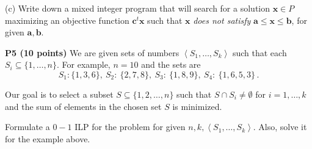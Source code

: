\documentclass[11pt]{article}
\begin{document}
\noindent (c) Write down a mixed integer program that will search for a solution
$\mathbf{x} \in P$ maximizing an objective function $\mathbf{c}^t \mathbf{x}$ 
such that $\mathbf{x}$ \emph{does not satisfy}
$\mathbf{a} \leq \mathbf{x} \leq \mathbf{b}$, for given $\mathbf{a}, \mathbf{b}$.

\medskip

\noindent\textbf{P5 (10 points)} We are given  sets of numbers
$\left\langle{S_1,\ldots,S_k}\right\rangle$ such that each $S_i \subseteq \{1,\ldots, n\}$.
For example, $n = 10$ and the sets are
\[ S_1: \{ 1,3,6\},\ S_2:\ \{2, 7, 8\},\ S_3:\ \{1,8,9\},\ S_4:\ \{1,6,5,3\} \,.\]

Our goal is to select a subset $S \subseteq \{ 1, 2, \ldots, n\}$ such that 
$S \cap S_i \not= \emptyset$ for $i = 1,\ldots, k$ and the sum of elements
in the chosen set $S$ is minimized.

Formulate a $0-1$ ILP for the problem for given $n, k, \left\langle{S_1,\ldots,S_k}\right\rangle$. Also,
 solve it for the example above.
\end{document}
